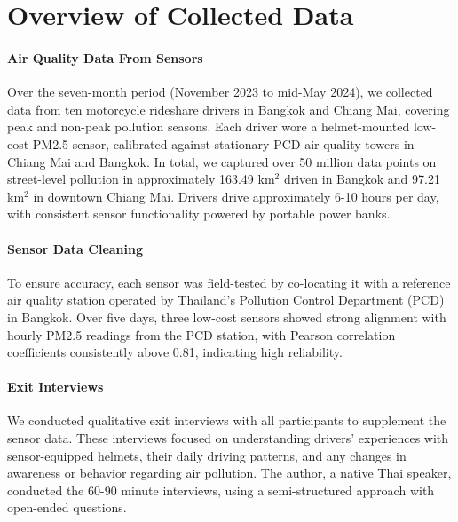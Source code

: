 \section{Overview of Collected Data}
\label{sec:result-overview-data}

\paragraph{Air Quality Data From Sensors}
Over the seven-month period (November 2023 to mid-May 2024), we collected data from ten motorcycle rideshare drivers in Bangkok and Chiang Mai, covering peak and non-peak pollution seasons.
Each driver wore a helmet-mounted low-cost PM2.5 sensor, calibrated against stationary PCD air quality towers in Chiang Mai and Bangkok.
In total, we captured over 50 million data points on street-level pollution in approximately 163.49 km$^2$ driven in Bangkok and 97.21 km$^2$ in downtown Chiang Mai.
Drivers drive approximately 6-10 hours per day, with consistent sensor functionality powered by portable power banks.



\paragraph{Sensor Data Cleaning}
To ensure accuracy, each sensor was field-tested by co-locating it with a reference air quality station operated by Thailand’s Pollution Control Department (PCD) in Bangkok.
Over five days, three low-cost sensors showed strong alignment with hourly PM2.5 readings from the PCD station, with Pearson correlation coefficients consistently above 0.81, indicating high reliability.





\paragraph{Exit Interviews}
We conducted qualitative exit interviews with all participants to supplement the sensor data. 
These interviews focused on understanding drivers' experiences with sensor-equipped helmets, their daily driving patterns, and any changes in awareness or behavior regarding air pollution. 
The author, a native Thai speaker, conducted the 60-90 minute interviews, using a semi-structured approach with open-ended questions. 
